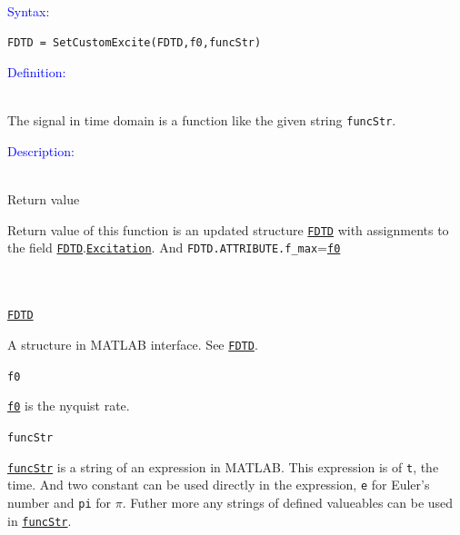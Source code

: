 \textcolor{blue}{\begin{large}Syntax:\end{large}}
 \begin{lstlisting}
FDTD = SetCustomExcite(FDTD,f0,funcStr)
 \end{lstlisting}

\textcolor{blue}{\begin{large}Definition:\end{large}}\\
      The signal in time domain is a function like the given string \texttt{funcStr}.

\textcolor{blue}{\begin{large}Description:\end{large}}\\
Return value 
	\begin{myindentpar}
	    Return value of this function is an updated structure \hyperref[para:FDTD]{\texttt{FDTD}} with assignments to the field \hyperref[para:FDTD]{\texttt{FDTD}}.\hyperref[para:Excitation]{\texttt{Excitation}}. And \texttt{FDTD.ATTRIBUTE.f\_max}=\hyperref[para:f0]{\texttt{f0}}
       \end{myindentpar}
	      \\ \\
	\hyperref[para:FDTD]{\texttt{FDTD}} 
	    \begin{myindentpar}
		A structure in MATLAB interface. See \hyperref[para:FDTD]{\texttt{FDTD}}.
	    \end{myindentpar}
	\texttt{f0}   \label{para:custom_f0} %
	    \begin{myindentpar}
		\hyperref[para:f0]{\texttt{f0}}  is the nyquist rate. 
	    \end{myindentpar}
	\texttt{funcStr}   \label{para:custom_funcStr} %
	    \begin{myindentpar}
		\hyperref[para:custom_funcStr]{\texttt{funcStr}}   is a string of an expression in MATLAB. This expression is of \texttt{t}, the time. And two constant can be used directly in the expression, \texttt{e} for Euler's number and \texttt{pi} for $\pi$. Futher more any strings of defined valueables can be used in \hyperref[para:custom_funcStr]{\texttt{funcStr}}.
	    \end{myindentpar}

